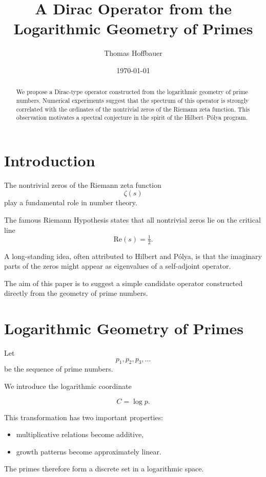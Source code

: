 \documentclass[11pt]{article}
\title{
	A Dirac Operator from the Logarithmic Geometry of Primes
}
\author{
	Thomas Hoffbauer
}
\date{\today}
\begin{document}
	
	\maketitle
	
	\begin{abstract}
		We propose a Dirac-type operator constructed from the logarithmic
		geometry of prime numbers.
		Numerical experiments suggest that the spectrum of this operator
		is strongly correlated with the ordinates of the nontrivial zeros
		of the Riemann zeta function.
		This observation motivates a spectral conjecture
		in the spirit of the Hilbert--Pólya program.
	\end{abstract}
	
	\section{Introduction}
	
	The nontrivial zeros of the Riemann zeta function
	\[
	\zeta(s)
	\]
	play a fundamental role in number theory.
	
	The famous Riemann Hypothesis states that all nontrivial zeros lie on
	the critical line
	\[
	\mathrm{Re}(s)=\tfrac12 .
	\]
	
	A long-standing idea, often attributed to Hilbert and Pólya,
	is that the imaginary parts of the zeros might appear
	as eigenvalues of a self-adjoint operator.
	
	The aim of this paper is to suggest a simple candidate operator
	constructed directly from the geometry of prime numbers.
	
	\section{Logarithmic Geometry of Primes}
	
	Let
	\[
	p_1,p_2,p_3,\dots
	\]
	be the sequence of prime numbers.
	
	We introduce the logarithmic coordinate
	
	\[
	C = \log p.
	\]
	
	This transformation has two important properties:
	
	\begin{itemize}
		\item multiplicative relations become additive,
		\item growth patterns become approximately linear.
	\end{itemize}
	
	The primes therefore form a discrete set in a logarithmic space.
	
\end{document}

